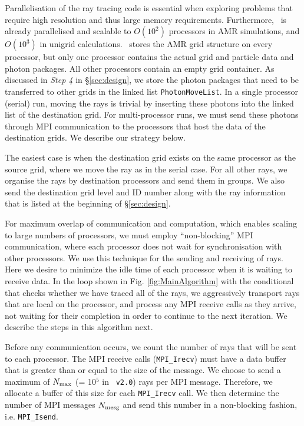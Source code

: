 \documentclass[useAMS,usenatbib]{mn2e}
\begin{document}
Parallelisation of the ray tracing code is essential when exploring
problems that require high resolution and thus large memory
requirements.  Furthermore, \enzo~is already parallelised and scalable
to $O(10^2)$ processors in AMR simulations, and $O(10^3)$ in unigrid
calculations.  \enzo~stores the AMR grid structure on every processor,
but only one processor contains the actual grid and particle data and
photon packages.  All other processors contain an empty grid
container.  As discussed in \textit{Step 4} in \S\ref{sec:design}, we
store the photon packages that need to be transferred to other grids
in the linked list \texttt{PhotonMoveList}.  In a single processor
(serial) run, moving the rays is trivial by inserting these photons
into the linked list of the destination grid.  For multi-processor
runs, we must send these photons through MPI communication to the
processors that host the data of the destination grids.  We describe
our strategy below.

The easiest case is when the destination grid exists on the same
processor as the source grid, where we move the ray as in the serial
case.  For all other rays, we organise the rays by destination
processors and send them in groups.  We also send the destination grid
level and ID number along with the ray information that is listed at
the beginning of \S\ref{sec:design}.

For maximum overlap of communication and computation, which enables
scaling to large numbers of processors, we must employ
``non-blocking'' MPI communication, where each processor does not wait
for synchronisation with other processors.  We use this technique for
the sending and receiving of rays.  Here we desire to minimize the
idle time of each processor when it is waiting to receive data.  In
the loop shown in Fig. \ref{fig:MainAlgorithm} with the conditional
that checks whether we have traced all of the rays, we aggressively
transport rays that are local on the processor, and process any MPI
receive calls as they arrive, not waiting for their completion in
order to continue to the next iteration.  We describe the steps in
this algorithm next.

 Before any communication occurs, we count the number of rays
that will be sent to each processor.  The MPI receive calls
(\texttt{MPI\_Irecv}) must have a data buffer that is greater than or
equal to the size of the message.  We choose to send a maximum of
$N_{\rm max}$ (= 10$^5$ in \enzo~\texttt{v2.0}) rays per MPI message.
Therefore, we allocate a buffer of this size for each
\texttt{MPI\_Irecv} call.  We then determine the number of MPI messages
$N_{\rm mesg}$ and send this number in a non-blocking fashion,
i.e. \texttt{MPI\_Isend}.
\end{document}
